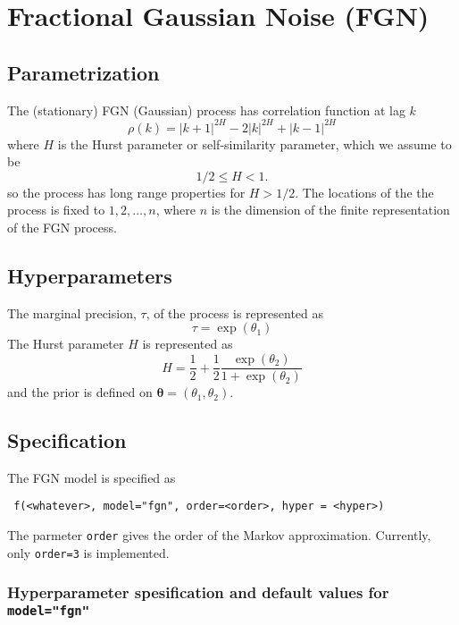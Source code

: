 \documentclass[a4paper,11pt]{article}
\begin{document}
\section*{Fractional Gaussian Noise (FGN)}

\subsection*{Parametrization}

The (stationary) FGN (Gaussian) process has correlation function  at
lag $k$
\begin{displaymath}
    \rho(k) = |k+1|^{2H} -2|k|^{2H} + |k-1|^{2H}
\end{displaymath}
where $H$ is the Hurst parameter or self-similarity parameter, which
we assume to be
\begin{displaymath}
    1/2 \le H < 1.
\end{displaymath}
so the process has long range properties for $H>1/2$. The locations of
the the process is fixed to $1, 2, \ldots, n$, where $n$ is the
dimension of the finite representation of the FGN process.

\subsection*{Hyperparameters}

The marginal precision, $\tau$, of the process is represented as
\begin{displaymath}
    \tau = \exp(\theta_1)
\end{displaymath}
The Hurst parameter $H$ is represented as
\[
    H = \frac{1}{2} + \frac{1}{2} \frac{\exp(\theta_2)}{1+\exp(\theta_2)}
\]
and the prior is defined on $\mathbf{\theta}=(\theta_1,\theta_2)$. 

\subsection*{Specification}

The FGN model is specified as
\begin{verbatim}
 f(<whatever>, model="fgn", order=<order>, hyper = <hyper>)
\end{verbatim}
The parmeter \texttt{order} gives the order of the Markov
approximation. Currently, only \texttt{order=3} is implemented.

\subsubsection*{Hyperparameter spesification and default values for \texttt{model="fgn"}}

\end{document}
